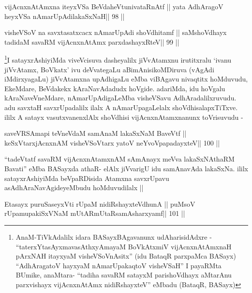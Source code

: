\begin{shl}
vijAcnxnAtAmxna iteyxVSa BeVdaheVtunivataRnAtf ||
yata AdhAragoV heyxVSa nAmarUpAdilakaSxNaH\hfill || 98 ||
\end{shl}

\begin{shl}
visheVSoV na savxtasatxcacx nAmarUpAdi shoVdhitamf ||
saMshoVdhayx tadidaM savaRM vijAcnxnAtAmx parxdashayxRteV\hfill || 99 ||
\end{shl}

\begin{artha}
\footnote[1]{AnaM-TiVkAdalilx idara BASayxBAgavanunx udAharisidAdxre -
``taterxYtasAyxmavasAthxyAmayaM BoVkAtx\s miV vijAcnxnAtAmxnaH
  pArxNAH itayxyaM visheVSoVnAsitx'' (idu BataqR parxpaMca BASayx)
  ``AdhAragatoV hayxyaM nAmarUpakaqtoV visheVSaH'' I payaRMta BUmike,
  anaMtara- ``tadiha savaRM satayxM parishoVdhayx aMtarA\s nu
  parxvishayx vijAcnxnAtAmx nidiRshayxteV'' eMbadu (BataqR, BASayx)}I 
  satayxrAshiyiMda viveVcisuva dasheyalilx jiVvAtamxnu
irutitxralu `ivanu jiVvAtamx, BoVkatx' ivu deVvategaLu
aBimAnisikoMDiruva (vAgAdi iMdirxyagaLu) jiVvAtamxna upAdhigaLu eMba
viBAgavu nivaqtitx hoMduvudu, EkeMdare, BeVdakekx kAraNavAdadudx
hoVgide. adariMda, idu hoVgalu kAraNaveVneMdare, nAmarUpAdigaLeMba
visheVSavu AdhAradalilxruvudu. adu savxtaH savxrUpadalilx ilalx A
nAmarUpagaLelalx shoVdhisalapxTiTxve. ililx A satayx vasutxvanenxlAlx
shoVdhisi vijAcnxnAtamxnanunx toVrisuvudu -
\end{artha}

\begin{shl}
saveVRSAmapi teVneVdaM samAnaM lakaSxNaM BaveVtf ||
keSxVtarxjAcnxnAM visheVSoV\s tarx yatoV neYvoVpapadayxteV\hfill || 100 ||
\end{shl}

\begin{artha}
``tadeVtatf savaRM vijAcnxnAtamxnAM sAmAnayx meVva lakaSxNAthaRM
  Bavati'' eMba BASayxda athaR- elAlx jiVvarigU idu samAnavAda
  lakaSxNa. ililx satayxrAshiyiMda beVpaRDisida Atamxna savxrUpavu
  asAdhAraNavAgideyeMbudu hoMduvudilalx ||
\end{artha}



\begin{shl}
Etasayx puruSaseyxVti rUpaM nidiRshayxteV\s dhunA ||
puMsoV rUpamupakiSxVNaM mUtARmUtaRsamAsharxyamf\hfill || 101 ||
\end{shl}

